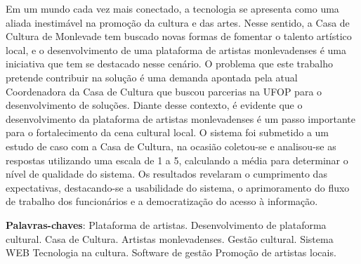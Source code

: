 \setlength{\absparsep}{18pt} %

\begin{resumo}
Em um mundo cada vez mais conectado, a tecnologia se apresenta como uma aliada inestimável na promoção da cultura e das artes. Nesse sentido, a Casa de Cultura de Monlevade tem buscado novas formas de fomentar o talento artístico local, e o desenvolvimento de uma plataforma de artistas monlevadenses é uma iniciativa que tem se destacado nesse cenário. O problema que este trabalho pretende contribuir na solução é uma demanda apontada pela atual Coordenadora da Casa de Cultura que buscou parcerias na UFOP para o desenvolvimento de soluções. Diante desse contexto, é evidente que o desenvolvimento da plataforma de artistas monlevadenses é um passo importante para o fortalecimento da cena cultural local. O sistema foi submetido a um estudo de caso com a Casa de Cultura, na ocasião coletou-se e analisou-se as respostas utilizando uma escala de 1 a 5, calculando a média para determinar o nível de qualidade do sistema. Os resultados revelaram o cumprimento das expectativas, destacando-se a usabilidade do sistema, o aprimoramento do fluxo de trabalho dos funcionários e a democratização do acesso à informação.


 \textbf{Palavras-chaves}:     
    Plataforma de artistas.
    Desenvolvimento de plataforma cultural.
    Casa de Cultura.
    Artistas monlevadenses.
    Gestão cultural.
    Sistema WEB
    Tecnologia na cultura.
    Software de gestão
    Promoção de artistas locais.
\end{resumo}
